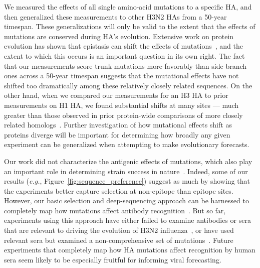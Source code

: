 \documentclass[9pt,twocolumn,twoside]{pnas-new}
\begin{document}
We measured the effects of all single amino-acid mutations to a specific HA, and then generalized these measurements to other H3N2 HAs from a 50-year timespan.
These generalizations will only be valid to the extent that the effects of mutations are conserved during HA's evolution.
Extensive work on protein evolution has shown that epistasis can shift the effects of mutations~\cite{gong2013stability,natarajan2013epistasis,harms2014historical,starr2016epistasis,starr2017alternative,haddox2017mapping}, and the extent to which this occurs is an important question in its own right.
The fact that our measurements score trunk mutations more favorably than side branch ones across a 50-year timespan suggests that the mutational effects have not shifted too dramatically among these relatively closely related sequences.
On the other hand, when we compared our measurements for an H3 HA to prior measurements on H1 HA, we found substantial shifts at many sites --- much greater than those observed in prior protein-wide comparisons of more closely related homologs~\cite{doud2015site,haddox2017mapping}.
Further investigation of how mutational effects shift as proteins diverge will be important for determining how broadly any given experiment can be generalized when attempting to make evolutionary forecasts.

Our work did not characterize the antigenic effects of mutations, which also play an important role in determining strain success in nature~\cite{koel2013substitutions,neher2016prediction}.
Indeed, some of our results (\textit{e.g.}, Figure~\ref{fig:sequence_preference}) suggest as much by showing that the experiments better capture selection at non-epitope than epitope sites.
However, our basic selection and deep-sequencing approach can be harnessed to completely map how mutations affect antibody recognition~\cite{doud2017complete,doud2017quantifying}.
But so far, experiments using this approach have either failed to examine antibodies or sera that are relevant to driving the evolution of H3N2 influenza~\cite{doud2017complete,doud2017quantifying}, or have used relevant sera but examined a non-comprehensive set of mutations~\cite{li2016selection}.
Future experiments that completely map how HA mutations affect recognition by human sera seem likely to be especially fruitful for informing viral forecasting.
\end{document}
